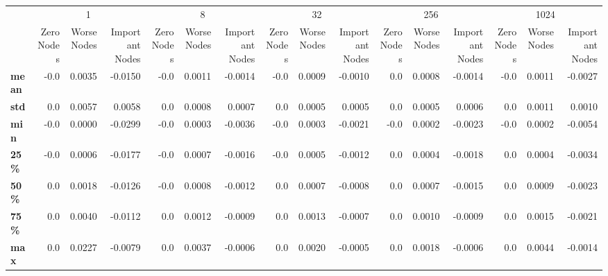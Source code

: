 \begin{tabular}{lrrrrrrrrrrrrrrr}
\toprule
{} & \multicolumn{3}{c}{1} & \multicolumn{3}{c}{8} & \multicolumn{3}{c}{32} & \multicolumn{3}{c}{256} & \multicolumn{3}{c}{1024} \\
{} & Zero Nodes & Worse Nodes & Important Nodes & Zero Nodes & Worse Nodes & Important Nodes & Zero Nodes & Worse Nodes & Important Nodes & Zero Nodes & Worse Nodes & Important Nodes & Zero Nodes & Worse Nodes & Important Nodes \\
\midrule
\textbf{mean} &       -0.0 &      0.0035 &         -0.0150 &       -0.0 &      0.0011 &         -0.0014 &       -0.0 &      0.0009 &         -0.0010 &        0.0 &      0.0008 &         -0.0014 &       -0.0 &      0.0011 &         -0.0027 \\
\textbf{std } &        0.0 &      0.0057 &          0.0058 &        0.0 &      0.0008 &          0.0007 &        0.0 &      0.0005 &          0.0005 &        0.0 &      0.0005 &          0.0006 &        0.0 &      0.0011 &          0.0010 \\
\textbf{min } &       -0.0 &      0.0000 &         -0.0299 &       -0.0 &      0.0003 &         -0.0036 &       -0.0 &      0.0003 &         -0.0021 &       -0.0 &      0.0002 &         -0.0023 &       -0.0 &      0.0002 &         -0.0054 \\
\textbf{25\% } &       -0.0 &      0.0006 &         -0.0177 &       -0.0 &      0.0007 &         -0.0016 &       -0.0 &      0.0005 &         -0.0012 &        0.0 &      0.0004 &         -0.0018 &        0.0 &      0.0004 &         -0.0034 \\
\textbf{50\% } &        0.0 &      0.0018 &         -0.0126 &       -0.0 &      0.0008 &         -0.0012 &        0.0 &      0.0007 &         -0.0008 &        0.0 &      0.0007 &         -0.0015 &        0.0 &      0.0009 &         -0.0023 \\
\textbf{75\% } &        0.0 &      0.0040 &         -0.0112 &        0.0 &      0.0012 &         -0.0009 &        0.0 &      0.0013 &         -0.0007 &        0.0 &      0.0010 &         -0.0009 &        0.0 &      0.0015 &         -0.0021 \\
\textbf{max } &        0.0 &      0.0227 &         -0.0079 &        0.0 &      0.0037 &         -0.0006 &        0.0 &      0.0020 &         -0.0005 &        0.0 &      0.0018 &         -0.0006 &        0.0 &      0.0044 &         -0.0014 \\
\bottomrule
\end{tabular}
